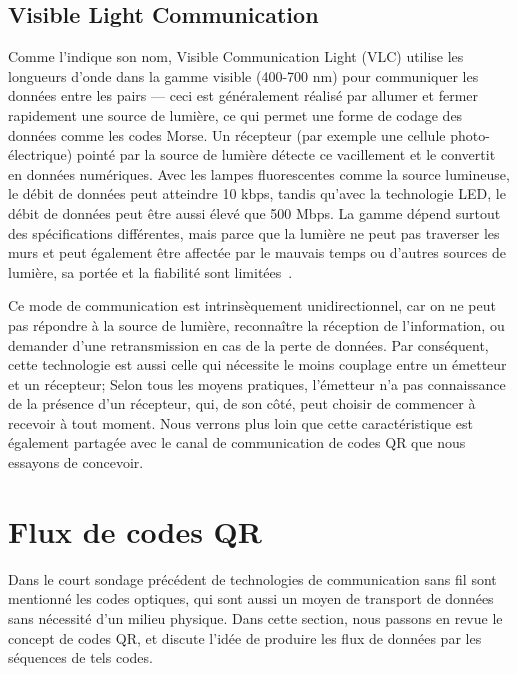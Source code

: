 \subsection{Visible Light Communication}

Comme l'indique son nom, Visible Communication Light (VLC) \citep{komine2004fundamental} utilise les longueurs d'onde dans la gamme visible (400-700 nm) pour communiquer les données entre les pairs --- ceci est généralement réalisé par allumer et fermer rapidement une source de lumière, ce qui permet une forme de codage des données comme les codes Morse. Un récepteur (par exemple une cellule photo-électrique) pointé par la source de lumière détecte ce vacillement et le convertit en données numériques. Avec les lampes fluorescentes comme la source lumineuse, le débit de données peut atteindre 10 kbps, tandis qu'avec la technologie LED, le débit de données peut être aussi élevé que 500 Mbps. La gamme dépend surtout des spécifications différentes, mais parce que la lumière ne peut pas traverser les murs et peut également être affectée par le mauvais temps ou d'autres sources de lumière, sa portée et la fiabilité sont limitées~\citep{arnon2015visible}.

Ce mode de communication est intrinsèquement unidirectionnel, car on ne peut pas répondre à la source de lumière, reconnaître la réception de l'information, ou demander d'une retransmission en cas de la perte de données. Par conséquent, cette technologie est aussi celle qui nécessite le moins couplage entre un émetteur et un récepteur; Selon tous les moyens pratiques, l'émetteur n'a pas connaissance de la présence d'un récepteur, qui, de son côté, peut choisir de commencer à recevoir à tout moment. Nous verrons plus loin que cette caractéristique est également partagée avec le canal de communication de codes QR que nous essayons de concevoir.


\section{Flux de codes QR}\label{sec:qr:qrcode} %

Dans le court sondage précédent de technologies de communication sans fil sont mentionné les codes optiques, qui sont aussi un moyen de transport de données sans nécessité d'un milieu physique. Dans cette section, nous passons en revue le concept de codes QR, et discute l'idée de produire les flux de données par les séquences de tels codes.

